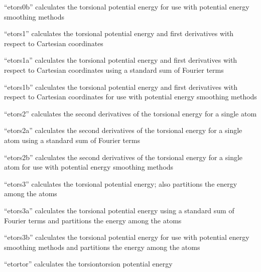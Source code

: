 \documentclass[letterpaper,11pt,english]{sphinxmanual}
\begin{document}

“etors0b” calculates the torsional potential energy
for use with potential energy smoothing methods


“etors1” calculates the torsional potential energy and first
derivatives with respect to Cartesian coordinates


“etors1a” calculates the torsional potential energy and first
derivatives with respect to Cartesian coordinates using a
standard sum of Fourier terms


“etors1b” calculates the torsional potential energy and first
derivatives with respect to Cartesian coordinates for use with
potential energy smoothing methods


“etors2” calculates the second derivatives of the torsional
energy for a single atom


“etors2a” calculates the second derivatives of the torsional
energy for a single atom using a standard sum of Fourier terms


“etors2b” calculates the second derivatives of the torsional
energy for a single atom for use with potential energy
smoothing methods


“etors3” calculates the torsional potential energy; also
partitions the energy among the atoms


“etors3a” calculates the torsional potential energy using
a standard sum of Fourier terms and partitions the energy
among the atoms


“etors3b” calculates the torsional potential energy for use
with potential energy smoothing methods and partitions the
energy among the atoms


“etortor” calculates the torsion\sphinxhyphen{}torsion potential energy
\end{document}

